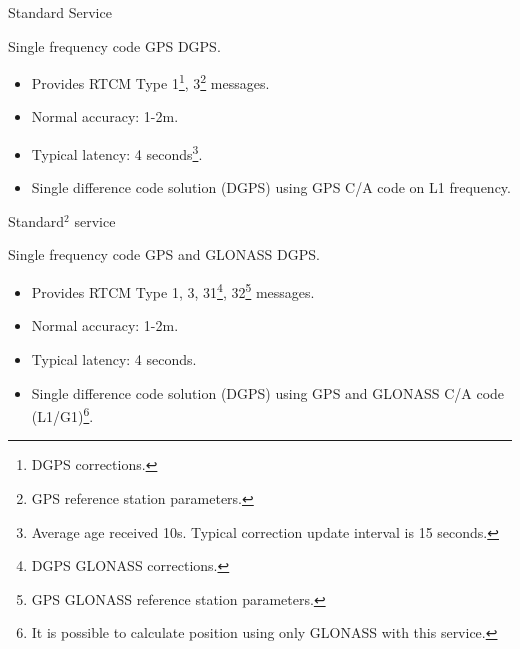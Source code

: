 \documentclass[11pt]{beamer}
\begin{document}
\begin{frame}[allowframebreaks]{Standard Service}

	Single frequency code GPS DGPS.

	\begin{itemize}	
		\item Provides RTCM Type 1\footnote[frame]{DGPS corrections.}, 3\footnote[frame]{GPS reference station parameters.} messages.
		\item Normal accuracy: 1-2m. 
		\item Typical latency: 4 seconds\footnote[frame]{Average age received 10s. Typical correction update interval is 15 seconds.}.
		\item Single difference code solution (DGPS) using GPS C/A code on L1 frequency.
	\end{itemize}	

\end{frame}


\begin{frame}{Standard$^2$ service}
	
	Single frequency code GPS and GLONASS DGPS. 

	\begin{itemize}	
		\item Provides RTCM Type 1, 3, 31\footnote{DGPS GLONASS corrections.}, 32\footnote{GPS GLONASS reference station parameters.} messages.
		\item Normal accuracy: 1-2m. 
		\item Typical latency: 4 seconds.
		\item Single difference code solution (DGPS) using GPS and GLONASS C/A code (L1/G1)\footnote[frame]{It is possible to calculate position using only GLONASS with this service.}.
	\end{itemize}	
	
\end{frame}
\end{document}
